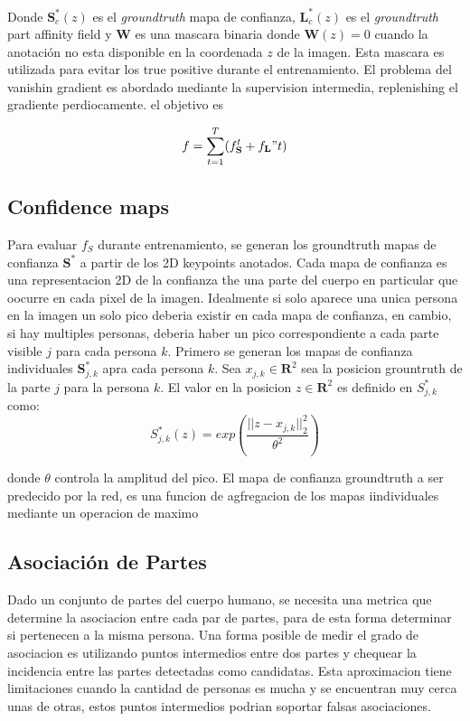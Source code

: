 \documentclass[runningheads]{llncs}
\begin{document}
Donde $\textbf{S}_{c}^*(z)$ es el \textit{groundtruth} mapa de confianza, $\textbf{L}_{c}^*(z)$ es el \textit{groundtruth} part affinity field y $\textbf{W}$ es una mascara binaria donde $\textbf{W}(z) = 0$ cuando la anotación no esta disponible en la coordenada $z$ de la imagen. Esta mascara es utilizada para evitar los true positive durante el entrenamiento. El problema del vanishin gradient es abordado mediante la supervision intermedia, replenishing el gradiente perdiocamente. el objetivo es 

\begin{equation}
f = \sum_{t=1}^{T}(f_{\textbf{S}}^t + f_{\textbf{L}}"t)
\end{equation} 


\subsection{Confidence maps}
Para evaluar $f_S$ durante entrenamiento, se generan los groundtruth mapas de confianza $\textbf{S}^*$ a partir de los 2D keypoints anotados. Cada mapa de confianza es una representacion 2D de la confianza the una parte del cuerpo en particular que oocurre en cada pixel de la imagen. Idealmente si solo aparece una unica persona en la imagen un solo pico deberia existir en cada mapa de confianza, en cambio, si hay multiples personas, deberia haber un pico correspondiente a cada parte visible $j$ para cada persona $k$.
Primero se generan los mapas de confianza individuales  $\textbf{S}_{j,k}
^*$ apra cada persona $k$. Sea $x_{j,k} \in \mathbf{R}^2$ sea la posicion grountruth de la parte $j$ para la persona $k$. El valor en la posicion $z \in \mathbf{R}^2$ es definido en $S_{j,k}^*$ como:
\begin{equation}
S_{j,k}^*(z) = exp(\frac{||z - x_{j,k}||_2^2}{\theta^2})
\end{equation}

donde $\theta$ controla la amplitud del pico. El mapa de confianza groundtruth a ser predecido por la red, es una funcion de agfregacion de los mapas iindividuales mediante un operacion de maximo

\subsection{Asociación de Partes}
Dado un conjunto de partes del cuerpo humano, se necesita una metrica que determine la asociacion entre cada par de partes, para de esta forma determinar si pertenecen a la misma persona. Una forma posible de medir el grado de asociacion es utilizando puntos intermedios entre dos partes y chequear la incidencia entre las partes detectadas como candidatas. Esta aproximacion tiene limitaciones cuando la cantidad de personas es mucha y se encuentran muy cerca unas de otras, estos puntos intermedios podrian soportar falsas asociaciones.
\end{document}
